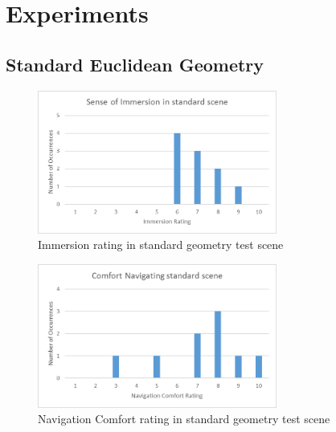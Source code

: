 	\section{Experiments}
	\label{exp:exp}

		\subsection{Standard Euclidean Geometry}
		\label{exp:exp:standard}


			\begin{figure}[H]
				\includegraphics[width=0.7\textwidth]{Images/Standard_Immersion}
				\centering
				\caption{Immersion rating in standard geometry test scene}
				\label{exp:fig:standard_immersion}
			\end{figure}

			\begin{figure}[H]
				\includegraphics[width=0.7\textwidth]{Images/Standard_Comfort}
				\centering
				\caption{Navigation Comfort rating in standard geometry test scene}
				\label{exp:fig:standard_comfort}
			\end{figure}

